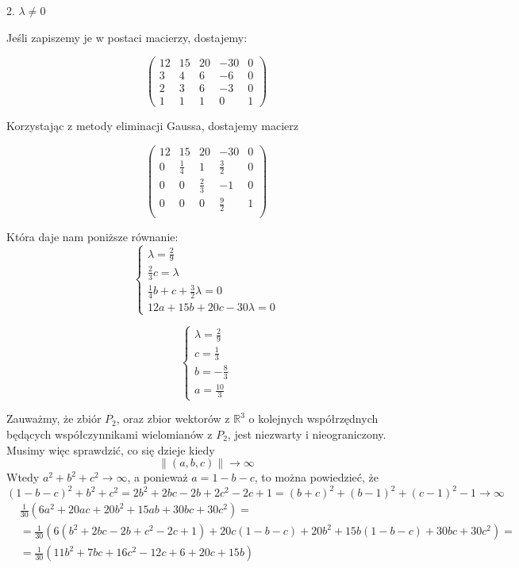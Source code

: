 \documentclass{article}[13pt]
\newcommand{\R}{\mathds{R}}
\begin{document}
    {\color{def}2. $\lambda\neq0$}
    \medskip

    Jeśli zapiszemy je w postaci macierzy, dostajemy:
    
    $$
        \begin{pmatrix}
            12 &15& 20& -30& 0\\
            3 & 4& 6& -6& 0\\
            2 &3& 6& -3& 0\\
            1& 1& 1& 0& 1
        \end{pmatrix}
    $$

    Korzystając z metody eliminacji Gaussa, dostajemy macierz

    $$
        \begin{pmatrix}
            12 & 15	& 20&	-30&	0\\
            0&	\frac14	&  1&	\frac32&	0\\
            0	&  0	&\frac23	 &-1&	0\\
            0	&  0	&  0&	\frac92	&1\\
        \end{pmatrix}
    $$

    Która daje nam poniższe równanie:
    $$
        \begin{cases}
            \lambda=\frac29\\
            \frac23c=\lambda\\
            \frac14b+c+\frac32\lambda=0\\
            12a+15b+20c-30\lambda=0
        \end{cases}
    $$

    $$
        \begin{cases}
            \lambda=\frac29\\
            c=\frac13\\
            b=-\frac83\\
            a=\frac{10}3
        \end{cases}
    $$

    Zauważmy, że zbiór $P_2$, oraz zbior wektorów z $\R^3$ o kolejnych współrzędnych będących współczynnikami wielomianów z $P_2$, jest niezwarty i nieograniczony. Musimy więc sprawdzić, co się dzieje kiedy
    $$\|(a,b,c)\|\to\infty$$
    Wtedy $a^2+b^2+c^2\to\infty$, a ponieważ $a=1-b-c$, to można powiedzieć, że
    $$(1-b-c)^2+b^2+c^2=2b^2+2bc-2b+2c^2-2c+1=(b+c)^2+(b-1)^2+(c-1)^2-1\to\infty$$
    \begin{align*}
        &\frac1{30}(6a^2+20ac+20b^2+15ab+30bc+30c^2)=\\
        &=\frac1{30}(6(b^2+2bc-2b+c^2-2c+1)+20c(1-b-c)+20b^2+15b(1-b-c)+30bc+30c^2)=\\
        &=\frac1{30}(11b^2+7bc+16c^2-12c+6+20c+15b)
    \end{align*}
    
\end{document}
